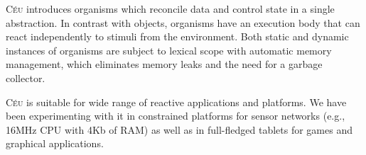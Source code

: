 \documentclass{acm_proc_article-sp}
\newcommand{\CEU}{\textsc{C\'{e}u}\xspace}
\newcommand{\1}{\;}
\newcommand{\2}{\;\;}
\newcommand{\3}{\;\;\;}
\newcommand{\5}{\;\;\;\;\;}
\begin{document}
\CEU introduces organisms which reconcile data and control state in a single 
abstraction.
%
In contrast with objects, organisms have an execution body that can react 
independently to stimuli from the environment.
%
Both static and dynamic instances of organisms are subject to lexical scope 
with automatic memory management, which eliminates memory leaks and the need 
for a garbage collector.

\CEU is suitable for wide range of reactive applications and platforms.
%
We have been experimenting with it in constrained platforms for sensor networks 
(e.g., 16MHz CPU with 4Kb of RAM) as well as in full-fledged tablets for games 
and graphical applications.




\end{document}
